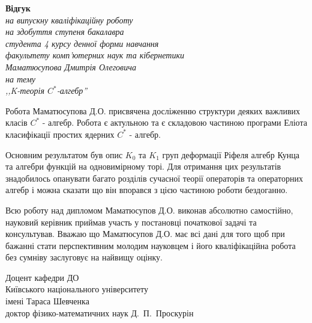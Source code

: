 \documentclass[a4paper,12pt]{report}
\begin{document}

    \begin{center}
        \textbf{Відгук \\}
        \textit{на випускну кваліфікаційну роботу \\
            на здобуття ступеня бакалавра \\
            студента 4 курсу денної форми навчання \\
            факультету комп'ютерних наук та кібернетики \\
            Маматюсупова Дмитрія Олеговича \\
            на тему \\ ,,K-теорія $C^*$-алгебр''}

    \end{center}

    \vspace{3mm}
    Робота Маматюсупова Д.О. присвячена досліженню структури деяких важливих класів $C^*$ - алгебр.
    Робота є актульною та є складовою частиною програми Еліота класифікації простих ядерних $C^*$ - алгебр.

    Основним результатом був опис $K_0$ та $K_1$ груп деформації Ріфеля алгебр Кунца та алгебри функцій на одновимірному торі.
    Для отримання цих результатів знадобилось опанувати багато розділів сучасної теорії операторів та операторних алгебр
    і можна сказати що він впорався з цією частиною роботи бездоганно.

    Всю роботу над дипломом Маматюсупов Д.О. виконав абсолютно самостійно,
    науковий керівник приймав участь у постановці початкової задачі та консультував.
    Вважаю що Маматюсупов Д.О. має всі дані для того щоб при бажанні стати перспективним молодим науковцем і його кваліфікаційна
    робота без сумніву заслуговує на найвищу оцінку.

    \vspace{3mm}


    \noindent
    Доцент кафедри ДО\\
    Київського національного університету\\
    імені Тараса Шевченка \\
    доктор фізико-математичних наук \hspace{4cm} Д.~П.~Проскурін




    \pagestyle{empty}
\end{document}
